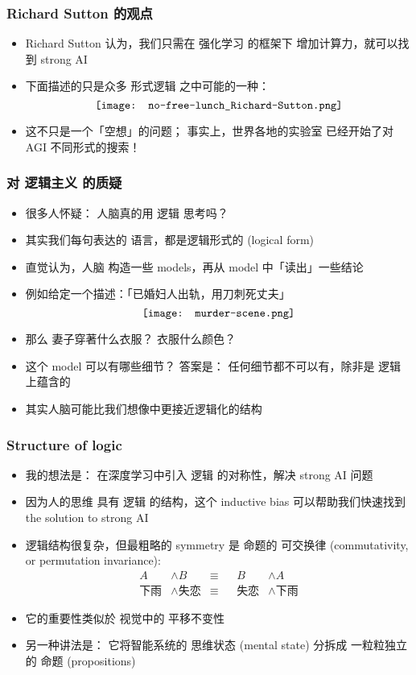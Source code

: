 \documentclass[16pt]{beamer}
\newcommand{\emp}[1]{{\color{violet}#1}}
\begin{document}
\begin{frame}
\frametitle{Richard Sutton 的观点}
\begin{itemize}
	\item Richard Sutton 认为，我们只需在 强化学习 的框架下 \emp{增加计算力}，就可以找到 strong AI
	\item 下面描述的只是众多 形式逻辑 之中可能的一种：
	\begin{equation}
	\vcenter{\hbox{\texttt{[image: no-free-lunch\_Richard-Sutton.png]}}}
	\end{equation}
	\item 这不只是一个「空想」的问题； 事实上，世界各地的实验室 已经开始了对 AGI 不同形式的搜索！
\end{itemize}
\end{frame}

\begin{frame}
\frametitle{对 逻辑主义 的质疑}
\begin{itemize}
	\item 很多人怀疑： 人脑真的用 逻辑 思考吗？
	\item 其实我们每句表达的 \emp{语言}，都是逻辑形式的 (logical form)
	\item 直觉认为，人脑 构造一些 \emp{models}，再从 model 中「读出」一些结论
	\item 例如给定一个描述：「已婚妇人出轨，用刀刺死丈夫」
	\begin{equation}
	\vcenter{\hbox{\texttt{[image: murder-scene.png]}}}
	\end{equation}
	\item 那么 妻子穿著什么衣服？ 衣服什么颜色？ 
	\item 这个 model 可以有哪些细节？ 答案是： 任何细节都不可以有，除非是 逻辑上蕴含的
	\item 其实人脑可能比我们想像中更接近逻辑化的结构
\end{itemize}
\end{frame}

\begin{frame}
\frametitle{Structure of logic}
\begin{itemize}
	\item 我的想法是： 在深度学习中引入 \emp{逻辑} 的对称性，解决 strong AI 问题
	\item 因为人的思维 具有 逻辑 的结构，这个 inductive bias 可以帮助我们快速找到 the solution to strong AI
	\item 逻辑结构很复杂，但最粗略的 symmetry 是 命题的 \emp{可交换律} (commutativity, or permutation invariance):
	\begin{equation}
	\begin{aligned}
	A &\wedge B & \equiv && B & \wedge A \\
	\mbox{下雨} &\wedge \mbox{失恋} & \equiv && \mbox{失恋} &\wedge \mbox{下雨}
	\end{aligned}
	\end{equation}
	\item 它的重要性类似於 视觉中的 平移不变性
	\item 另一种讲法是： 它将智能系统的 \emp{思维状态} (mental state) 分拆成 一粒粒独立的 \emp{命题} (propositions)
\end{itemize}
\end{frame}
\end{document}

